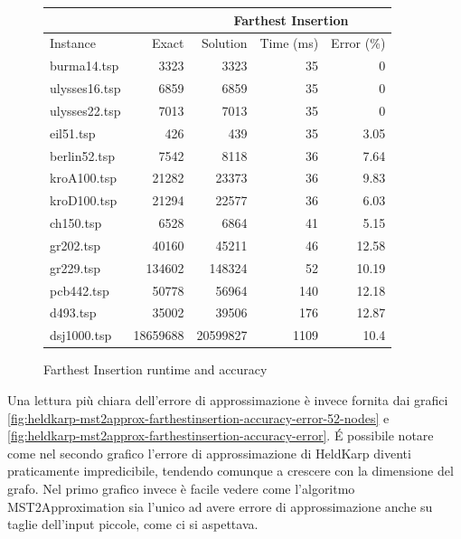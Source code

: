 \begin{figure}[H]
    \centering

    \begin{tabular}{lrrrr}
    \toprule
    \multicolumn{2}{c}{ } & \multicolumn{3}{c}{Farthest Insertion} \\
    \hline
    Instance & Exact & Solution &   Time (ms) &   Error (\%) \\
    \hline
    burma14.tsp   &     3323 &       3323 &          35 &        0    \\
    ulysses16.tsp &     6859 &       6859 &          35 &        0    \\
    ulysses22.tsp &     7013 &       7013 &          35 &        0    \\
    eil51.tsp     &      426 &        439 &          35 &        3.05 \\
    berlin52.tsp  &     7542 &       8118 &          36 &        7.64 \\
    kroA100.tsp   &    21282 &      23373 &          36 &        9.83 \\
    kroD100.tsp   &    21294 &      22577 &          36 &        6.03 \\
    ch150.tsp     &     6528 &       6864 &          41 &        5.15 \\
    gr202.tsp     &    40160 &      45211 &          46 &       12.58 \\
    gr229.tsp     &   134602 &     148324 &          52 &       10.19 \\
    pcb442.tsp    &    50778 &      56964 &         140 &       12.18 \\
    d493.tsp      &    35002 &      39506 &         176 &       12.87 \\
    dsj1000.tsp   & 18659688 &   20599827 &        1109 &       10.4  \\
    \bottomrule
    \end{tabular}

    \caption{Farthest Insertion runtime and accuracy}
    \label{table:farthest-insertion-runtime-accuracy}
\end{figure}

Una lettura più chiara dell'errore di approssimazione è invece
fornita dai grafici 
\ref{fig:heldkarp-mst2approx-farthestinsertion-accuracy-error-52-nodes}
 e \ref{fig:heldkarp-mst2approx-farthestinsertion-accuracy-error}. 
\'E possibile notare come nel
secondo grafico l'errore di approssimazione di HeldKarp diventi 
praticamente impredicibile, tendendo comunque a crescere con la
dimensione del grafo. Nel primo grafico invece è facile vedere
come l'algoritmo MST2Approximation sia l'unico ad avere errore
di approssimazione anche su taglie dell'input piccole,
come ci si aspettava.

